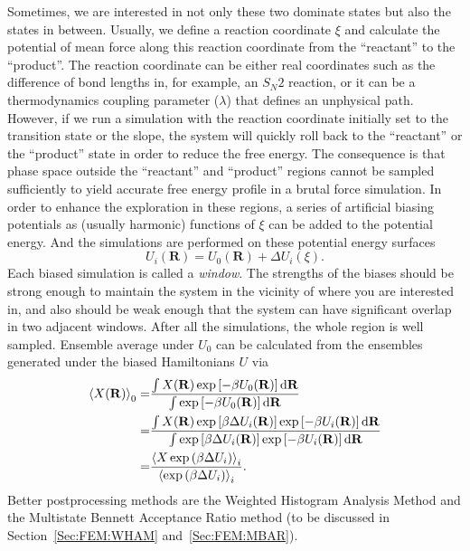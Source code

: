 Sometimes, we are interested in not only these two dominate states but also the states in between. Usually, we define a reaction coordinate $\xi$ and calculate the potential of mean force along this reaction coordinate from the ``reactant'' to the ``product''. The reaction coordinate can be either real coordinates such as the difference of bond lengths in, for example, an $S_N2$ reaction, or it can be a thermodynamics coupling parameter ($\lambda$) that defines an unphysical path. However, if we run a simulation with the reaction coordinate initially set to the transition state or the slope, the system will quickly roll back to the ``reactant'' or the ``product'' state in order to reduce the free energy. The consequence is that phase space outside the ``reactant'' and ``product'' regions cannot be sampled sufficiently to yield accurate free energy profile in a brutal force simulation. In order to enhance the exploration in these regions, 
a series of artificial biasing potentials as (usually harmonic) functions of $\xi$ can be added to the potential energy. And the simulations are performed on these potential energy surfaces 
\begin{equation}
	U_i(\mathbf{R})=U_0(\mathbf{R})+\Delta U_i(\xi).
\end{equation}
Each biased simulation is called a \textit{window}. The strengths of the biases should be strong enough to maintain the system in the vicinity of where you are interested in, and also should be weak enough that the system can have significant overlap in two adjacent windows. After all the simulations, the whole region is well sampled. Ensemble average under $U_0$ can be calculated from the ensembles generated under the biased Hamiltonians $U$ via
\begin{align}
	\left<X(\mathbf{R})\right>_0=&\frac{\int X(\mathbf{R})\exp{\left[-\beta U_0(\mathbf{R})\right]}\mathop{}\!\mathrm{d}\mathbf{R}}{\int \exp{\left[-\beta U_0(\mathbf{R})\right]}\mathop{}\!\mathrm{d}\mathbf{R}}\notag\\
	                            =&\frac{\int X(\mathbf{R})\exp{\left[\beta \Delta U_i(\mathbf{R})\right]}\exp{\left[-\beta U_i(\mathbf{R})\right]}\mathop{}\!\mathrm{d}\mathbf{R}}{\int \exp{\left[\beta \Delta U_i(\mathbf{R})\right]}\exp{\left[-\beta U_i(\mathbf{R})\right]}\mathop{}\!\mathrm{d}\mathbf{R}}\notag\\
	                =&\frac{\left<X\exp{\left(\beta\Delta U_i\right)}\right>_i}{\left<\exp{\left(\beta\Delta U_i\right)}\right>_i}.
\end{align}
Better postprocessing methods are the Weighted Histogram Analysis Method and the Multistate Bennett Acceptance Ratio method (to be discussed in Section~\ref{Sec:FEM:WHAM} and~\ref{Sec:FEM:MBAR}).